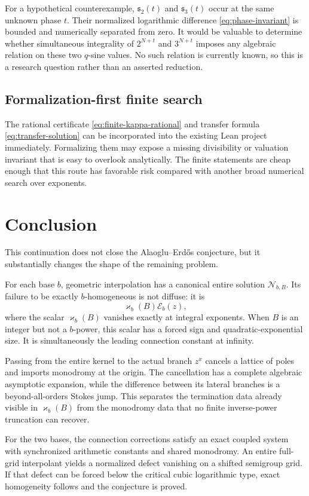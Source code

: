 \documentclass[11pt]{article}
\theoremstyle{definition}
\newcommand{\Nker}{\mathscr{N}}
\newcommand{\Eker}{\mathscr{E}}
\newcommand{\kk}{\varkappa}
\begin{document}
For a hypothetical counterexample, $\mathfrak{s}_2(t)$ and $\mathfrak{s}_3(t)$ occur at the same unknown phase $t$.  Their normalized logarithmic difference \eqref{eq:phase-invariant} is bounded and numerically separated from zero.  It would be valuable to determine whether simultaneous integrality of $2^{N+t}$ and $3^{N+t}$ imposes any algebraic relation on these two $q$-sine values.  No such relation is currently known, so this is a research question rather than an asserted reduction.

\subsection{Formalization-first finite search}

The rational certificate \eqref{eq:finite-kappa-rational} and transfer formula \eqref{eq:transfer-solution} can be incorporated into the existing Lean project immediately.  Formalizing them may expose a missing divisibility or valuation invariant that is easy to overlook analytically.  The finite statements are cheap enough that this route has favorable risk compared with another broad numerical search over exponents.

\section{Conclusion}

This continuation does not close the Alaoglu--Erd\H{o}s conjecture, but it substantially changes the shape of the remaining problem.

For each base $b$, geometric interpolation has a canonical entire solution $\Nker_{b,B}$.  Its failure to be exactly $b$-homogeneous is not diffuse: it is
\[
 \kk_b(B)\Eker_b(z),
\]
where the scalar $\kk_b(B)$ vanishes exactly at integral exponents.  When $B$ is an integer but not a $b$-power, this scalar has a forced sign and quadratic-exponential size.  It is simultaneously the leading connection constant at infinity.

Passing from the entire kernel to the actual branch $z^x$ cancels a lattice of poles and imports monodromy at the origin.  The cancellation has a complete algebraic asymptotic expansion, while the difference between its lateral branches is a beyond-all-orders Stokes jump.  This separates the termination data already visible in $\kk_b(B)$ from the monodromy data that no finite inverse-power truncation can recover.

For the two bases, the connection corrections satisfy an exact coupled system with synchronized arithmetic constants and shared monodromy.  An entire full-grid interpolant yields a normalized defect vanishing on a shifted semigroup grid.  If that defect can be forced below the critical cubic logarithmic type, exact homogeneity follows and the conjecture is proved.
\end{document}
